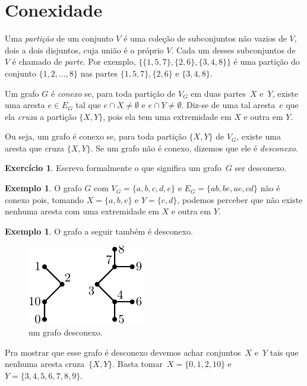\documentclass[12pt, a4paper]{article}
\theoremstyle{definition}
\newtheorem{exem}[teor]{Exemplo}
\newtheorem{exer}{Exercício}
\begin{document}
\section{Conexidade}
\label{conn}

Uma \emph{partição} de um conjunto $V$ é uma coleção de subconjuntos não vazios de $V$, dois a dois disjuntos, cuja união é o próprio $V$. Cada um desses subconjuntos de~$V$ é chamado de \emph{parte}. Por exemplo, $\big\{\{1, 5, 7\}, \{2, 6\}, \{3, 4, 8\}\big\}$ é uma partição do conjunto $\{1, 2, \dots, 8\}$ nas partes $\{1, 5, 7\}, \{2, 6\}$ e $\{3, 4, 8\}$.

Um grafo $G$ é \emph{conexo} se, para toda partição de $V_G$ em duas partes~$X$ e~$Y$, existe uma aresta $e \in E_G$ tal que $e \cap X \neq \emptyset$ e $e \cap Y \neq \emptyset$. Diz-se de uma tal aresta~$e$ que ela \emph{cruza} a partição $\{X,Y\}$, pois ela tem uma extremidade em $X$ e outra em $Y$.

Ou seja, um grafo é conexo se, para toda partição $\{X,Y\}$ de $V_G$, existe uma aresta que cruza $\{X,Y\}$. Se um grafo não é conexo, dizemos que ele é \emph{desconexo}.

\begin{exer}
Escreva formalmente o que significa um grafo~$G$ ser desconexo.
\end{exer}

\begin{exem}
O grafo $G$ com $V_G = \{a, b, c, d, e\}$ e $E_G = \{ab, be, ae, cd\}$ não é conexo pois, tomando $X = \{a, b, e\}$ e $Y = \{c, d\}$, podemos perceber que não existe nenhuma aresta com uma extremidade em $X$ e outra em $Y$. 
\end{exem}

\begin{exem}
  O grafo a seguir também é desconexo.
  \begin{figure}[H]
      \centering
      \includegraphics{desconexo-1.pdf}
      \caption{um grafo desconexo.}
      \label{fig:desc}
  \end{figure}
  \noindent Pra mostrar que esse grafo é desconexo devemos achar
  conjuntos~$X$ e~$Y$ tais que nenhuma aresta cruza~$\{X,Y\}$. Basta tomar~$X = \{0, 1, 2, 10\}$ e $Y = \{3, 4, 5, 6, 7, 8, 9\}$.
\end{exem}
\end{document}
